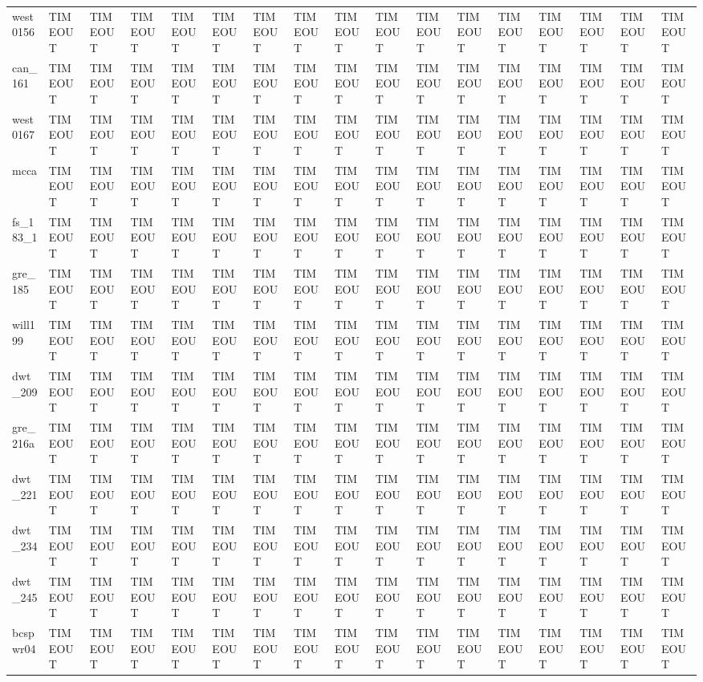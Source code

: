 \begin{tabular}{lllllllllllllllll}
west0156 & TIMEOUT & TIMEOUT & TIMEOUT & TIMEOUT & TIMEOUT & TIMEOUT & TIMEOUT & TIMEOUT & TIMEOUT & TIMEOUT & TIMEOUT & TIMEOUT & TIMEOUT & TIMEOUT & TIMEOUT & TIMEOUT \\
can\_161 & TIMEOUT & TIMEOUT & TIMEOUT & TIMEOUT & TIMEOUT & TIMEOUT & TIMEOUT & TIMEOUT & TIMEOUT & TIMEOUT & TIMEOUT & TIMEOUT & TIMEOUT & TIMEOUT & TIMEOUT & TIMEOUT \\
west0167 & TIMEOUT & TIMEOUT & TIMEOUT & TIMEOUT & TIMEOUT & TIMEOUT & TIMEOUT & TIMEOUT & TIMEOUT & TIMEOUT & TIMEOUT & TIMEOUT & TIMEOUT & TIMEOUT & TIMEOUT & TIMEOUT \\
mcca & TIMEOUT & TIMEOUT & TIMEOUT & TIMEOUT & TIMEOUT & TIMEOUT & TIMEOUT & TIMEOUT & TIMEOUT & TIMEOUT & TIMEOUT & TIMEOUT & TIMEOUT & TIMEOUT & TIMEOUT & TIMEOUT \\
fs\_183\_1 & TIMEOUT & TIMEOUT & TIMEOUT & TIMEOUT & TIMEOUT & TIMEOUT & TIMEOUT & TIMEOUT & TIMEOUT & TIMEOUT & TIMEOUT & TIMEOUT & TIMEOUT & TIMEOUT & TIMEOUT & TIMEOUT \\
gre\_185 & TIMEOUT & TIMEOUT & TIMEOUT & TIMEOUT & TIMEOUT & TIMEOUT & TIMEOUT & TIMEOUT & TIMEOUT & TIMEOUT & TIMEOUT & TIMEOUT & TIMEOUT & TIMEOUT & TIMEOUT & TIMEOUT \\
will199 & TIMEOUT & TIMEOUT & TIMEOUT & TIMEOUT & TIMEOUT & TIMEOUT & TIMEOUT & TIMEOUT & TIMEOUT & TIMEOUT & TIMEOUT & TIMEOUT & TIMEOUT & TIMEOUT & TIMEOUT & TIMEOUT \\
dwt\_209 & TIMEOUT & TIMEOUT & TIMEOUT & TIMEOUT & TIMEOUT & TIMEOUT & TIMEOUT & TIMEOUT & TIMEOUT & TIMEOUT & TIMEOUT & TIMEOUT & TIMEOUT & TIMEOUT & TIMEOUT & TIMEOUT \\
gre\_216a & TIMEOUT & TIMEOUT & TIMEOUT & TIMEOUT & TIMEOUT & TIMEOUT & TIMEOUT & TIMEOUT & TIMEOUT & TIMEOUT & TIMEOUT & TIMEOUT & TIMEOUT & TIMEOUT & TIMEOUT & TIMEOUT \\
dwt\_221 & TIMEOUT & TIMEOUT & TIMEOUT & TIMEOUT & TIMEOUT & TIMEOUT & TIMEOUT & TIMEOUT & TIMEOUT & TIMEOUT & TIMEOUT & TIMEOUT & TIMEOUT & TIMEOUT & TIMEOUT & TIMEOUT \\
dwt\_234 & TIMEOUT & TIMEOUT & TIMEOUT & TIMEOUT & TIMEOUT & TIMEOUT & TIMEOUT & TIMEOUT & TIMEOUT & TIMEOUT & TIMEOUT & TIMEOUT & TIMEOUT & TIMEOUT & TIMEOUT & TIMEOUT \\
dwt\_245 & TIMEOUT & TIMEOUT & TIMEOUT & TIMEOUT & TIMEOUT & TIMEOUT & TIMEOUT & TIMEOUT & TIMEOUT & TIMEOUT & TIMEOUT & TIMEOUT & TIMEOUT & TIMEOUT & TIMEOUT & TIMEOUT \\
bcspwr04 & TIMEOUT & TIMEOUT & TIMEOUT & TIMEOUT & TIMEOUT & TIMEOUT & TIMEOUT & TIMEOUT & TIMEOUT & TIMEOUT & TIMEOUT & TIMEOUT & TIMEOUT & TIMEOUT & TIMEOUT & TIMEOUT \\

\end{tabular}

